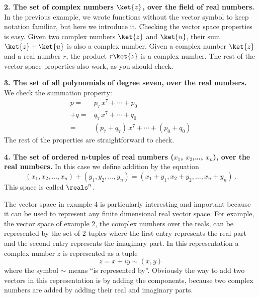 \noindent \textbf{2. The set of complex numbers $\ket{z}$, over the field of real numbers.}
In the previous example, we wrote functions without the vector symbol to keep notation familiar, but here we introduce it.
Checking the vector space properties is easy.
Given two complex numbers $\ket{z}$ and $\ket{u}$, their sum $\ket{z} + \ket{u}$ is also a complex number.
Given a complex number $\ket{z}$ and a real number $r$, the product $r\ket{z}$ is a complex number.
The rest of the vector space properties also work, as you should check.\newline

\noindent \textbf{3. The set of all polynomials of degree seven, over the real numbers.}
We check the summation property:
\begin{equation*}
  \begin{split}
    p =& p_7\,x^7 + \cdots + p_0 \\
   +q =& q_7\,x^7 + \cdots + q_0 \\
    \hline
      =& (p_7 + q_7) \, x^7 + \cdots + (p_0 + q_0)
  \end{split}
\end{equation*}
The rest of the properties are straightforward to check.\newline

\noindent \textbf{4. The set of ordered n-tuples of real numbers ($x_1$, $x_2$,\ldots , $x_n$), over the real numbers.}
In this case we define addition by the equation
\begin{equation*}
  (x_1, x_2, \ldots, x_n) + (y_1, y_2, \ldots, y_n) = (x_1 + y_1, x_2 + y_2, \ldots, x_n + y_n) \, .
\end{equation*}
This space is called $\reals^n$.

The vector space in example 4 is particularly interesting and important because it can be used to represent any finite dimensional real vector space.
For example, the vector space of example 2, the complex numbers over the reals, can be represented by the set of 2-tuples where the first entry represents the real part and the second entry represents the imaginary part.
In this representation a complex number $z$ is represented as a tuple
\begin{equation*}
  z = x + iy \sim (x,y)
\end{equation*}
where the symbol $\sim$ means ``is represented by''.
Obviously the way to add two vectors in this representation is by adding the components, because two complex numbers are added by adding their real and imaginary parts.

